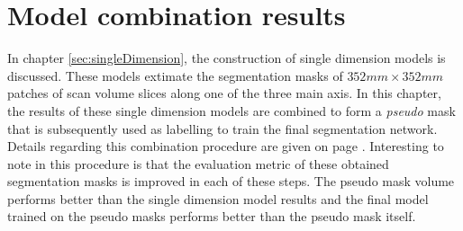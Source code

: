 \chapter{Model combination results\label{sec:combination}}\thispagestyle{empty}

In chapter \ref{sec:singleDimension}, the construction of single dimension models is discussed.
These models extimate the segmentation masks of $352 mm\times 352 mm$ patches of scan volume slices along one of the three main axis.
In this chapter, the results of these single dimension models are combined to form a \textit{pseudo} mask that is subsequently used as labelling to train the final segmentation network.
Details regarding this combination procedure are given on page \pageref{sec:combinationProcedure}.
Interesting to note in this procedure is that the evaluation metric of these obtained segmentation masks is improved in each of these steps.
The pseudo mask volume performs better than the single dimension model results and the final model trained on the pseudo masks performs better than the pseudo mask itself. 

